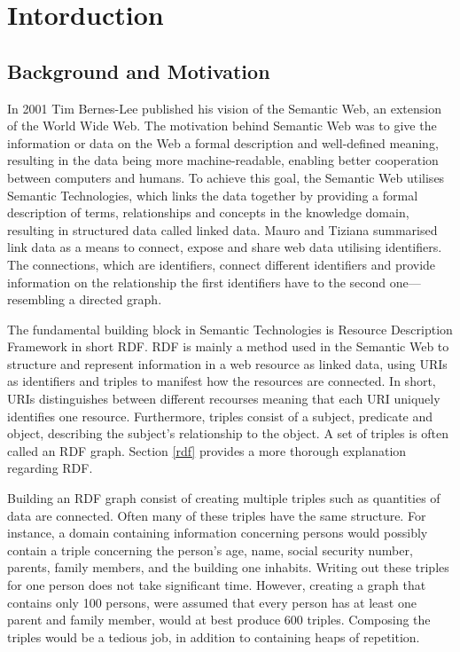 
\chapter{Intorduction}
\label{intro}

\section{Background and Motivation}
In 2001 Tim Bernes-Lee published his vision of the Semantic Web, an extension of the World Wide Web\cite{Berner-Lee_The_samantic_web}. The motivation behind Semantic Web was to give the information or data on the Web a formal description and well-defined meaning, resulting in the data being more machine-readable, enabling better cooperation between computers and humans\cite{Berner-Lee_The_samantic_web}. To achieve this goal, the Semantic Web utilises Semantic Technologies, which links the data together by providing a formal description of terms, relationships and concepts in the knowledge domain, resulting in structured data called linked data. Mauro and Tiziana summarised link data as a means to connect, expose and share web data utilising identifiers\cite{Mauro_Tiziana_linked_data}. The connections, which are identifiers, connect different identifiers and provide information on the relationship the first identifiers have to the second one—resembling a directed graph. 

\para
The fundamental building block in Semantic Technologies is Resource Description Framework in short RDF\cite{W3C_RDF}. RDF is mainly a method used in the Semantic Web to structure and represent information in a web resource as linked data, using URIs as identifiers and triples to manifest how the resources are connected. In short, URIs distinguishes between different recourses meaning that each URI uniquely identifies one resource. Furthermore, triples consist of a subject, predicate and object, describing the subject's relationship to the object. A set of triples is often called an RDF graph. Section \ref{rdf} provides a more thorough explanation regarding RDF.

\para
Building an RDF graph consist of creating multiple triples such as quantities of data are connected. Often many of these triples have the same structure. For instance, a domain containing information concerning persons would possibly contain a triple concerning the person's age, name, social security number, parents, family members, and the building one inhabits. Writing out these triples for one person does not take significant time. However, creating a graph that contains only 100 persons, were assumed that every person has at least one parent and family member, would at best produce 600 triples. Composing the triples would be a tedious job, in addition to containing heaps of repetition.

